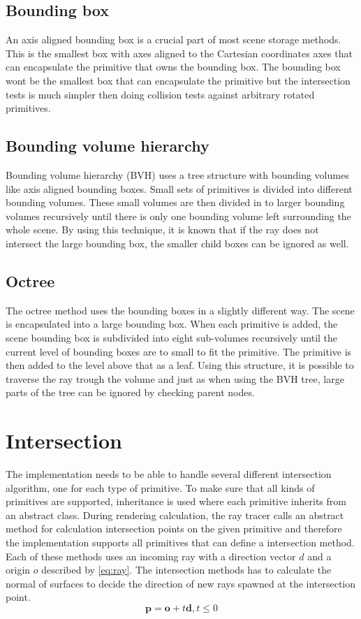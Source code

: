 \documentclass[]{report}   %
\begin{document}
\subsection{Bounding box}
An axis aligned bounding box is a crucial part of most scene storage methods.
This is the smallest box with axes aligned to the Cartesian coordinates axes that can encapsulate the primitive that owns the bounding box.
The bounding box wont be the smallest box that can encapsulate the primitive but the intersection tests is much simpler then doing collision tests against arbitrary rotated primitives.

\subsection{Bounding volume hierarchy}
Bounding volume hierarchy (BVH) uses a tree structure with bounding volumes like axis aligned bounding boxes. 
Small sets of primitives is divided into different bounding volumes.
These small volumes are then divided in to larger bounding volumes recursively until there is only one bounding volume left surrounding the whole scene.
By using this technique, it is known that if the ray does not intersect the large bounding box, the smaller child boxes can be ignored as well.

\subsection{Octree}
The octree method uses the bounding boxes in a slightly different way.
The scene is encapsulated into a large bounding box.
When each primitive is added, the scene bounding box is subdivided into eight sub-volumes recursively until the current level of bounding boxes are to small to fit the primitive.
The primitive is then added to the level above that as a leaf.
Using this structure, it is possible to traverse the ray trough the volume and just as when using the BVH tree, large parts of the tree can be ignored by checking parent nodes.

\section{Intersection}
The implementation needs to be able to handle several different intersection algorithm, one for each type of primitive.
To make sure that all kinds of primitives are supported, inheritance is used where each primitive inherits from an abstract class.
During rendering calculation, the ray tracer calls an abstract method for calculation intersection points on the given primitive and therefore the implementation supports all primitives that can define a intersection method.
Each of these methods uses an incoming ray with a direction vector $d$ and a origin $o$ described by \autoref{eq:ray}.
The intersection methods has to calculate the normal of surfaces to decide the direction of new rays spawned at the intersection point.
\begin{equation} \label{eq:ray}
\mathbf{p} = \mathbf{o} + t \mathbf{d}, t \leq 0
\end{equation}
\end{document}
